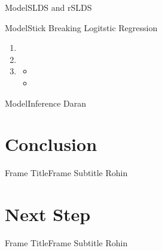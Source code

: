\documentclass{beamer}
\begin{document}
\begin{frame}{Model}{SLDS and rSLDS}

    \end{frame}

\begin{frame}{Model}{Stick Breaking Logitstic Regression}
       \begin{tcolorbox}[colback=blue!10!white,colframe=blue!50!black,title=Stick Breaking Logitstic Regression,boxrule=2pt, boxsep=0.1em, left=0.1em, right=0.1em,
fontupper=\fontsize{8}{10}\selectfont] %
\begin{enumerate}[\textbullet]
\item
\item 
    \item 
        \begin{itemize}
            \item 
            \item
        \end{itemize}
\end{enumerate}
\end{tcolorbox}

    \end{frame}

\begin{frame}{Model}{Inference}
        Daran

    \end{frame}


\section{Conclusion}

\begin{frame}{Frame Title}{Frame Subtitle}
        Rohin

    \end{frame}

\section{Next Step}

\begin{frame}{Frame Title}{Frame Subtitle}
        Rohin

    \end{frame}
\end{document}
